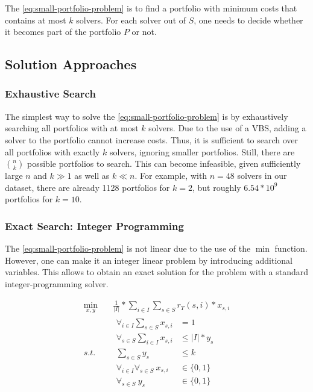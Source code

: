 \documentclass[conference]{IEEEtran}
\begin{document}
The \ref{eq:small-portfolio-problem} is to find a portfolio with minimum costs that contains at most $k$ solvers.
For each solver out of $S$, one needs to decide whether it becomes part of the portfolio $P$ or not.

\subsection{Solution Approaches}
\label{sec:approach:solution}

\subsubsection{Exhaustive Search}

The simplest way to solve the \ref{eq:small-portfolio-problem} is by exhaustively searching all portfolios with at most $k$ solvers.
Due to the use of a VBS, adding a solver to the portfolio cannot increase costs.
Thus, it is sufficient to search over all portfolios with exactly $k$ solvers, ignoring smaller portfolios.
Still, there are $\binom{n}{k}$ possible portfolios to search.
This can become infeasible, given sufficiently large $n$ and $k \gg 1$ as well as $k \ll n$.
For example, with $n=48$ solvers in our dataset, there are already 1128 portfolios for $k=2$, but roughly $6.54 * 10^9$ portfolios for $k=10$.

\subsubsection{Exact Search: Integer Programming}

The \ref{eq:small-portfolio-problem} is not linear due to the use of the $\min$ function.
However, one can make it an integer linear problem by introducing additional variables.
This allows to obtain an exact solution for the problem with a standard integer-programming solver.

\begin{equation}
	\label{eq:small-portfolio-integer-problem}
	\begin{aligned}
		\min_{x,y} \quad & \frac{1}{|I|} * \sum_{i \in I} \sum_{s \in S} r_T(s,i) * x_{s,i} \\
		s.t. \quad & \begin{aligned}
			\forall_{i\in I} \sum_{s \in S} x_{s,i} &= 1\\
			\forall_{s \in S} \sum_{i \in I} x_{s,i} &\leq |I| * y_s\\
			\sum_{s \in S} y_s &\leq k\\
			\forall_{i\in I} \forall_{s \in S}~x_{s,i} &\in \{0, 1\}\\
			\forall_{s \in S}~y_s &\in \{0,1\}
		\end{aligned}
	\end{aligned}
	\tag{Small-Portfolio Integer Problem}
\end{equation}
\end{document}
